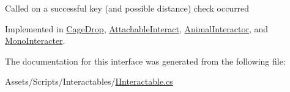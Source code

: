 Called on a successful key (and possible distance) check occurred



Implemented in \mbox{\hyperlink{class_cage_drop_a5832f1672e4475be50319fa8e23f5cbc}{Cage\+Drop}}, \mbox{\hyperlink{class_attachable_interact_a3ce9d2122b8b014f608ed3ed1004f909}{Attachable\+Interact}}, \mbox{\hyperlink{class_animal_interactor_ab7aa5df1cd2596715b1edf39752ae02f}{Animal\+Interactor}}, and \mbox{\hyperlink{class_mono_interacter_ae732e07805c24cad447adf6218658f23}{Mono\+Interacter}}.



The documentation for this interface was generated from the following file\+:\begin{DoxyCompactItemize}
\item 
Assets/\+Scripts/\+Interactables/\mbox{\hyperlink{_i_interactable_8cs}{I\+Interactable.\+cs}}\end{DoxyCompactItemize}

